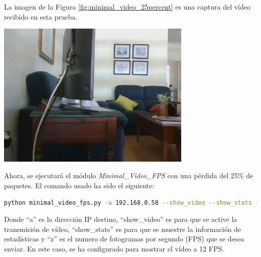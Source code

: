 \newpage
La imagen de la Figura \ref{fig:minimal_video_25percent} es una captura del vídeo recibido en esta prueba.
\begin{center}
  \includegraphics[width = 0.7\textwidth]{images/VideoRecibido8.1.png}
  \label{fig:minimal_video_25percent}
\end{center}

\newpage


Ahora, se ejecutará el módulo \textit{Minimal\_Video\_FPS} con una pérdida del 25\% de paquetes. El comando usado ha sido el siguiente:

\begin{lstlisting}[language=bash, basicstyle=\ttfamily\scriptsize]
    python minimal_video_fps.py -a 192.168.0.58 --show_video --show_stats -z 12
\end{lstlisting}
Donde ``a'' es la dirección IP destino, ``show\_video'' es para que se active la transmisión de vídeo, ``show\_stats'' es para que se muestre la información de estadísticas y ``z'' es el numero de fotogramas por segundo (FPS) que se desea enviar. En este caso, se ha configurado para mostrar el vídeo a 12 FPS.
\vspace{\baselineskip}

